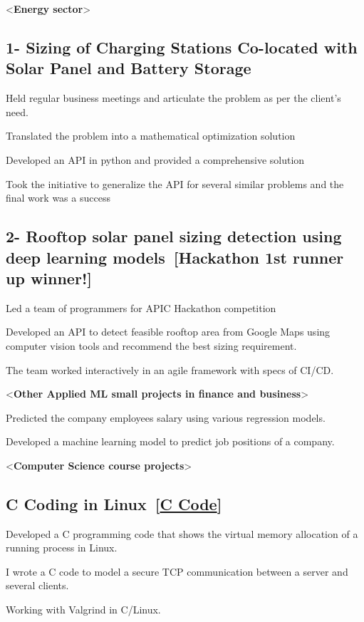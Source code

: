 \documentclass[letter,11pt]{article}
\begin{document}
	<\textbf{Energy sector}>
	\subsection{1- Sizing of Charging Stations Co-located with Solar Panel and Battery Storage}
\begin{zitemize}
	\item Held regular business meetings and articulate the problem as per the client's need.
	\item Translated the problem into a mathematical optimization solution
	\item Developed an API in python and provided a comprehensive solution
	\item Took the initiative to generalize the API for several similar problems and the final work was a success
\end{zitemize}



\subsection{2- Rooftop solar panel sizing detection using deep learning models~[Hackathon 1st runner up winner!]}
\begin{zitemize}
 \item Led a team of programmers for APIC Hackathon competition 
	\item Developed an API to detect feasible rooftop area from Google Maps using computer vision tools and recommend the best sizing requirement. 
	\item The team worked interactively in an agile framework with specs of CI/CD.
\end{zitemize}

<\textbf{Other Applied ML small projects in finance and business}>\vspace{-0.75em}
\begin{zitemize}
	\item Predicted the company employees salary using various regression models.
	\item Developed a machine learning model to predict job positions of a company.
\end{zitemize}
<\textbf{Computer Science course projects}>
\subsection{C Coding in Linux~[\href{https://github.com/Hadi2525/vmemory_maps}{C Code}]}
\begin{zitemize}
	\item Developed a C programming code that shows the virtual memory allocation of a running process in Linux. 
	\item I wrote a C code to model a secure TCP communication between a server and several clients.
	\item Working with Valgrind in C/Linux.
\end{zitemize}
\end{document}
